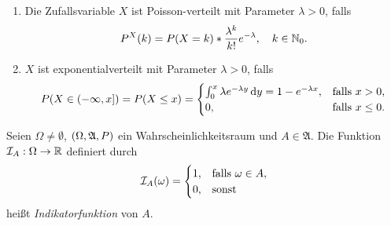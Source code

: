 \documentclass{lecture}
\begin{document}
    \begin{example}
        \begin{enumerate}
            \item Die Zufallsvariable \(X\) ist Poisson-verteilt mit Parameter \(\lambda > 0\), falls
            \[
                P^X\parentheses*{k} = P\parentheses*{X = k} * \frac{\lambda^k}{k!}e^{-\lambda}, \quad k \in \N_0.
            \]
            \item \(X\) ist exponentialverteilt mit Parameter \(\lambda > 0\), falls
            \[
                P\parentheses*{X \in \left(-\infty, x\right]} = P\parentheses*{X \le x} = \begin{cases}
                    \int_0^x \lambda e^{-\lambda y}\d y = 1 - e^{-\lambda x}, & \text{falls }x > 0,\\
                    0, & \text{falls }x \le 0.
                \end{cases}
            \]
        \end{enumerate}
    \end{example}

    \begin{definition}
        Seien \(\Omega \ne \emptyset\), \(\parentheses*{\Omega, \mathfrak{A}, P}\) ein Wahrscheinlichkeitsraum und \(A \in \mathfrak{A}\).
        Die Funktion \(\mathcal{I}_A: \Omega \to \R\) definiert durch
        \[
            \mathcal{I}_A\parentheses*{\omega} = \begin{cases}
                1, & \text{falls }\omega \in A,\\
                0, & \text{sonst}
            \end{cases}
        \]
        heißt \emph{Indikatorfunktion} von \(A\).
    \end{definition}
\end{document}
